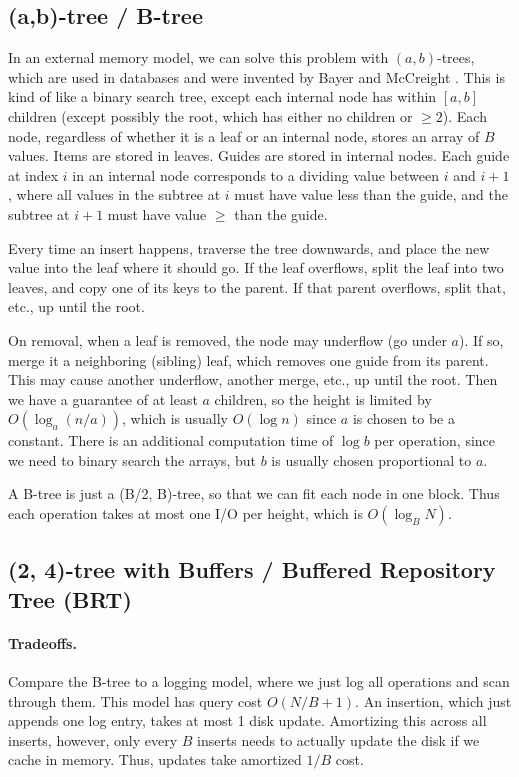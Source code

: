 \documentclass[11pt]{article}
\begin{document}
\subsection{(a,b)-tree / B-tree}

In an external memory model, we can solve this problem with $(a,b)$-trees, which are used in databases and were invented by Bayer and McCreight \cite{BM72}. This is kind of like a binary search tree, except each internal node has within $[a, b]$ children (except possibly the root, which has either no children or $\geq 2$). Each node, regardless of whether it is a leaf or an internal node, stores an array of $B$ values. Items are stored in leaves. Guides are stored in internal nodes. Each guide at index $i$ in an internal node corresponds to a dividing value between $i$ and $i + 1$, where all values in the subtree at $i$ must have value less than the guide, and the subtree at $i + 1$ must have value $\geq$ than the guide.

Every time an insert happens, traverse the tree downwards, and place the new value into the leaf where it should go. If the leaf overflows, split the leaf into two leaves, and copy one of its keys to the parent. If that parent overflows, split that, etc., up until the root.

On removal, when a leaf is removed, the node may underflow (go under $a$). If so, merge it a neighboring (sibling) leaf, which removes one guide from its parent. This may cause another underflow, another merge, etc., up until the root. Then we have a guarantee of at least $a$ children, so the height is limited by $O(\log_a(n/a))$, which is usually $O(\log n)$ since $a$ is chosen to be a constant. There is an additional computation time of $\log b$ per operation, since we need to binary search the arrays, but $b$ is usually chosen proportional to $a$.

A B-tree is just a (B/2, B)-tree, so that we can fit each node in one block. Thus each operation takes at most one I/O per height, which is $O(\log_B N)$.

\subsection{(2, 4)-tree with Buffers / Buffered Repository Tree (BRT)}

\paragraph{Tradeoffs.} Compare the B-tree to a logging model, where we just log all operations and scan through them. This model has query cost $O(N / B+1)$. An insertion, which just appends one log entry, takes at most 1 disk update. Amortizing this across all inserts, however, only every $B$ inserts needs to actually update the disk if we cache in memory. Thus, updates take amortized $1 / B$ cost.
\end{document}
